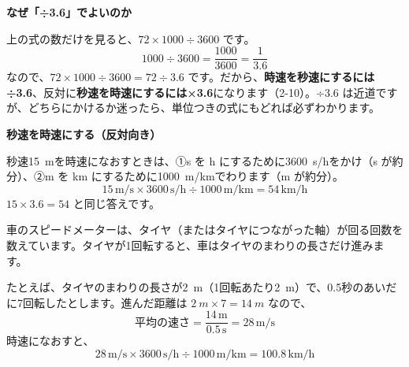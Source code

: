 \noindent\textbf{なぜ「÷3.6」でよいのか}\par
上の式の数だけを見ると、$72\times1000\div3600$ です。
\[ 1000\div3600=\frac{1000}{3600}=\frac{1}{3.6} \]
なので、$72\times1000\div3600=72\div3.6$ です。だから、\textbf{時速を秒速にするには÷3.6}、反対に\textbf{秒速を時速にするには×3.6}になります（2-10）。÷3.6 は近道ですが、どちらにかけるか迷ったら、単位つきの式にもどれば必ずわかります。

\noindent\textbf{秒速を時速にする（反対向き）}\par
秒速\qty{15}{m}を時速になおすときは、①s を h にするために\qty{3600}{s/h}をかけ（s が約分）、②m を km にするために\qty{1000}{m/km}でわります（m が約分）。
\[ 15\,\mathrm{m/s}\times3600\,\mathrm{s/h}\div1000\,\mathrm{m/km}=54\,\mathrm{km/h} \]
$15\times3.6=54$ と同じ答えです。


車のスピードメーターは、タイヤ（またはタイヤにつながった軸）が回る回数を数えています。タイヤが1回転すると、車はタイヤのまわりの長さだけ進みます。

たとえば、タイヤのまわりの長さが\qty{2}{m}（1回転あたり\qty{2}{m}）で、0.5秒のあいだに7回転したとします。進んだ距離は $\qty{2}{m}\times7=\qty{14}{m}$ なので、
\[ \text{平均の速さ}=\frac{14\,\mathrm{m}}{0.5\,\mathrm{s}}=28\,\mathrm{m/s} \]
時速になおすと、
\[ 28\,\mathrm{m/s}\times3600\,\mathrm{s/h}\div1000\,\mathrm{m/km}=100.8\,\mathrm{km/h} \]

